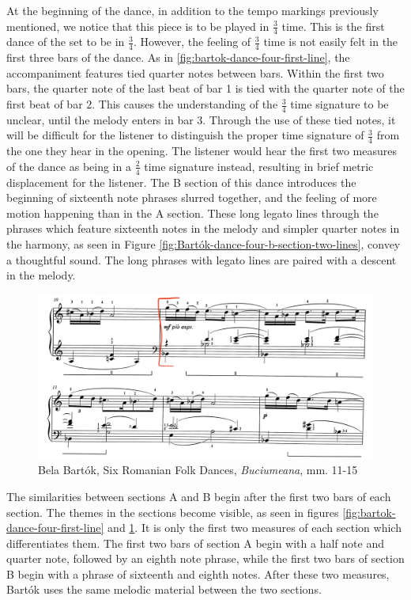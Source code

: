 At the beginning of the dance, in addition to the tempo markings previously mentioned, we notice that this piece is to be played in $\frac{3}{4}$ time. This is the first dance of the set to be in $\frac{3}{4}$. However, the feeling of $\frac{3}{4}$ time is not easily felt in the first three bars of the dance. As in \ref{fig:bartok-dance-four-first-line}\autocite{Lung_2016}, the accompaniment features tied quarter notes between bars. Within the first two bars, the quarter note of the last beat of bar 1 is tied with the quarter note of the first beat of bar 2. This causes the understanding of the $\frac{3}{4}$ time signature to be unclear, until the melody enters in bar 3. Through the use of these tied notes, it will be difficult for the listener to distinguish the proper time signature of $\frac{3}{4}$ from the one they hear in the opening. The listener would hear the first two measures of the dance as being in a $\frac{2}{4}$ time signature instead, resulting in brief metric displacement for the listener. The B section of this dance introduces the beginning of sixteenth note phrases slurred together, and the feeling of more motion happening than in the A section. These long legato lines through the phrases which feature sixteenth notes in the melody and simpler quarter notes in the harmony, as seen in Figure \ref{fig:Bartók-dance-four-b-section-two-lines}\autocite{Lung_2016}, convey a thoughtful sound. The long phrases with legato lines are paired with a descent in the melody. 

\begin{figure}[h]
  \centering
  \includegraphics[width=\textwidth]{figures/bartok-dance-four-b-section-two-lines.jpg}
  \caption{Bela Bartók, Six Romanian Folk Dances, \textit{Buciumeana}, mm. 11-15}
  \label{fig:bartok-dance-four-b-section-two-lines}
\end{figure}

The similarities between sections A and B begin after the first two bars of each section. The themes in the sections become visible, as seen in figures \ref{fig:bartok-dance-four-first-line}\autocite{Lung_2016} and \ref{fig:bartok-dance-four-b-section-two-lines}\autocite{Lung_2016}. It is only the first two measures of each section which differentiates them. The first two bars of section A begin with a half note and quarter note, followed by an eighth note phrase, while the first two bars of section B begin with a phrase of sixteenth and eighth notes. After these two measures, Bartók uses the same melodic material between the two sections. 

